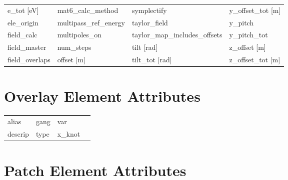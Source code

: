 \begin{tabular}{llll}
e_tot [eV]                     & mat6_calc_method               & symplectify                    & y_offset_tot [m]               \\
ele_origin                     & multipass_ref_energy           & taylor_field                   & y_pitch                        \\
field_calc                     & multipoles_on                  & taylor_map_includes_offsets    & y_pitch_tot                    \\
field_master                   & num_steps                      & tilt [rad]                     & z_offset [m]                   \\
field_overlaps                 & offset [m]                     & tilt_tot [rad]                 & z_offset_tot [m]               \\
 \bottomrule
 \end{tabular}
 \vfill
 
 \section{Overlay Element Attributes}
 \label{s:list.overlay}
 
 \begin{tabular}{llll} \toprule
alias                          & gang                           & var                            &                                \\
descrip                        & type                           & x_knot                         &                                \\
 \bottomrule
 \end{tabular}
 \vfill
 
 \section{Patch Element Attributes}
 \label{s:list.patch}
 
